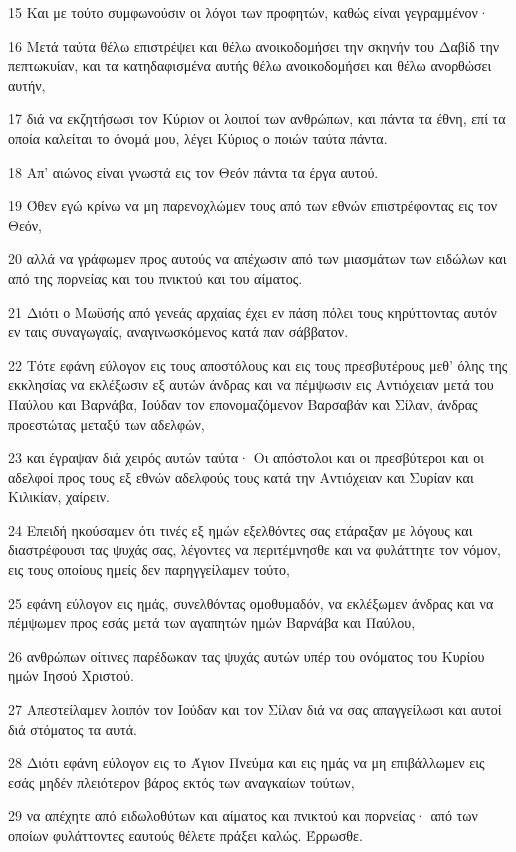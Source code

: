 \par 15 Και με τούτο συμφωνούσιν οι λόγοι των προφητών, καθώς είναι γεγραμμένον·
\par 16 Μετά ταύτα θέλω επιστρέψει και θέλω ανοικοδομήσει την σκηνήν του Δαβίδ την πεπτωκυίαν, και τα κατηδαφισμένα αυτής θέλω ανοικοδομήσει και θέλω ανορθώσει αυτήν,
\par 17 διά να εκζητήσωσι τον Κύριον οι λοιποί των ανθρώπων, και πάντα τα έθνη, επί τα οποία καλείται το όνομά μου, λέγει Κύριος ο ποιών ταύτα πάντα.
\par 18 Απ' αιώνος είναι γνωστά εις τον Θεόν πάντα τα έργα αυτού.
\par 19 Όθεν εγώ κρίνω να μη παρενοχλώμεν τους από των εθνών επιστρέφοντας εις τον Θεόν,
\par 20 αλλά να γράφωμεν προς αυτούς να απέχωσιν από των μιασμάτων των ειδώλων και από της πορνείας και του πνικτού και του αίματος.
\par 21 Διότι ο Μωϋσής από γενεάς αρχαίας έχει εν πάση πόλει τους κηρύττοντας αυτόν εν ταις συναγωγαίς, αναγινωσκόμενος κατά παν σάββατον.
\par 22 Τότε εφάνη εύλογον εις τους αποστόλους και εις τους πρεσβυτέρους μεθ' όλης της εκκλησίας να εκλέξωσιν εξ αυτών άνδρας και να πέμψωσιν εις Αντιόχειαν μετά του Παύλου και Βαρνάβα, Ιούδαν τον επονομαζόμενον Βαρσαβάν και Σίλαν, άνδρας προεστώτας μεταξύ των αδελφών,
\par 23 και έγραψαν διά χειρός αυτών ταύτα· Οι απόστολοι και οι πρεσβύτεροι και οι αδελφοί προς τους εξ εθνών αδελφούς τους κατά την Αντιόχειαν και Συρίαν και Κιλικίαν, χαίρειν.
\par 24 Επειδή ηκούσαμεν ότι τινές εξ ημών εξελθόντες σας ετάραξαν με λόγους και διαστρέφουσι τας ψυχάς σας, λέγοντες να περιτέμνησθε και να φυλάττητε τον νόμον, εις τους οποίους ημείς δεν παρηγγείλαμεν τούτο,
\par 25 εφάνη εύλογον εις ημάς, συνελθόντας ομοθυμαδόν, να εκλέξωμεν άνδρας και να πέμψωμεν προς εσάς μετά των αγαπητών ημών Βαρνάβα και Παύλου,
\par 26 ανθρώπων οίτινες παρέδωκαν τας ψυχάς αυτών υπέρ του ονόματος του Κυρίου ημών Ιησού Χριστού.
\par 27 Απεστείλαμεν λοιπόν τον Ιούδαν και τον Σίλαν διά να σας απαγγείλωσι και αυτοί διά στόματος τα αυτά.
\par 28 Διότι εφάνη εύλογον εις το Άγιον Πνεύμα και εις ημάς να μη επιβάλλωμεν εις εσάς μηδέν πλειότερον βάρος εκτός των αναγκαίων τούτων,
\par 29 να απέχητε από ειδωλοθύτων και αίματος και πνικτού και πορνείας· από των οποίων φυλάττοντες εαυτούς θέλετε πράξει καλώς. Έρρωσθε.
